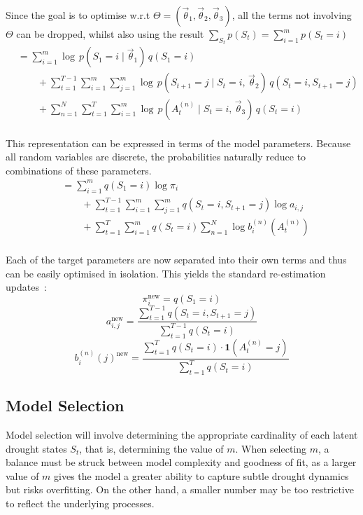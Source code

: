 Since the goal is to optimise w.r.t $\Theta = (\vec{\theta}_1,\vec{\theta}_2,\vec{\theta}_3)$, all the terms not involving $\Theta$ can be dropped, whilst also using the result $\sum\limits_{S_t} p(S_t) = \sum\limits_{i=1}^m p(S_t = i)$
\begin{align*}
    &= \sum\limits_{i=1}^m \log \, p(S_1 = i \mid \vec{\theta}_1) \, q(S_1 = i) \\
    & \qquad + \sum\limits_{t=1}^{T-1} \sum\limits_{i=1}^m \sum\limits_{j=1}^m \log \, p(S_{t+1} = j \mid S_t = i, \, \vec{\theta}_2) \, q(S_t = i, S_{t+1} = j) \\
    &\qquad + \sum\limits_{n=1}^N \sum\limits_{t=1}^T \sum\limits_{i=1}^m \log \, p(A_t^{(n)} \mid S_t = i, \, \vec{\theta}_3) \, q(S_t = i) \\
\end{align*}

This representation can be expressed in terms of the model parameters. Because all random variables are discrete, the probabilities naturally reduce to combinations of these parameters.
\begin{align*}
    &= \sum_{i=1}^m q(S_1 = i) \log \pi_i \\
    &\qquad + \sum_{t=1}^{T-1}\sum_{i=1}^m\sum_{j=1}^m q(S_t=i,S_{t+1}=j)\log a_{i,j}\\ 
    &\qquad +  \sum\limits_{t=1}^T \sum\limits_{i=1}^m  q(S_t = i)  \sum\limits_{n=1}^N \log b_i^{(n)}(A_t^{(n)}) \\
\end{align*}

Each of the target parameters are now separated into their own terms and thus can be easily optimised in isolation. This yields the standard re-estimation updates~\cite{jm3,xing_slides}:
\begin{equation}
    \boxed{\;\pi_i^{\text{new}} = q(S_1=i)\;}
    \label{eqn:prior_update_rule}
\end{equation}
\begin{equation}
    \boxed{\;a_{i,j}^{\text{new}}=\frac{\sum\limits_{t=1}^{T-1} q(S_t=i,S_{t+1}=j)}{\sum\limits_{t=1}^{T-1} q(S_t=i)}\;}
    \label{eqn:transition_update_rule}
\end{equation}
\begin{equation}
    \boxed{\; b_i^{(n)}(j)^{\text{new}} = \frac{\sum\limits_{t=1}^T q(S_t = i) \cdot \mathbf{1}(A_t^{(n)} = j)}{\sum\limits_{t=1}^T q(S_t = i)} \;}
    \label{eqn:emission_update_rule}
\end{equation}

\subsection{Model Selection}
\label{sec:model_selection}
Model selection will involve determining the appropriate cardinality of each latent drought states $S_t$, that is, determining the value of $m$. When selecting $m$, a balance must be struck between model complexity and goodness of fit, as a larger value of $m$ gives the model a greater ability to capture subtle drought dynamics but risks overfitting. On the other hand, a smaller number may be too restrictive to reflect the underlying processes.

